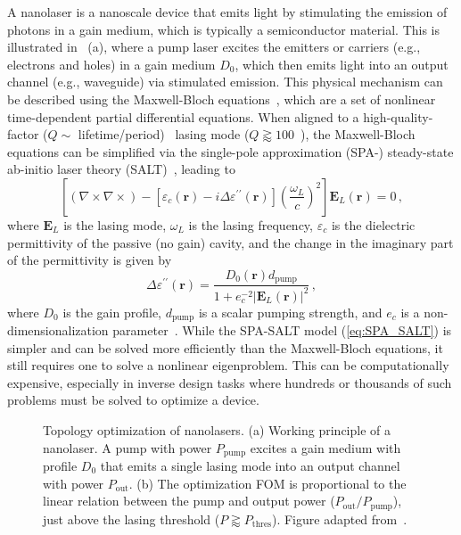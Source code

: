 A nanolaser is a nanoscale device that emits light by stimulating the emission of photons in a gain medium, which is typically a semiconductor material. This is illustrated
in ~(a), where a pump laser excites the emitters or carriers (e.g., electrons and holes) in a gain medium $D_0$, which then emits light into an output channel (e.g., waveguide) via
stimulated emission. This physical
mechanism can be described using the Maxwell-Bloch equations~\cite{haken_laser_dynamics, PhysRev.134.A1429, SALT_original}, which are a set of nonlinear time-dependent 
partial differential equations. When aligned to a high-quality-factor ($Q \sim$ lifetime/period)~\cite{phot_crys} lasing mode ($Q\gtrapprox 100$~\cite{cerjan_2016}), the Maxwell-Bloch equations can be simplified via the single-pole approximation (SPA-) steady-state ab-initio laser theory (SALT)~\cite{Ge_2010}, leading to
\begin{equation}\label{eq:SPA_SALT}
    \left[(\nabla \times 
     \nabla \times ) -\left[\varepsilon_c(\mathbf{r})-i \Delta \varepsilon^{\prime \prime} (\mathbf{r})\right] \left(\frac{\omega_L}{c}\right)^2\right] \mathbf{E}_L(\mathbf{r})=0\,,
\end{equation}
where $\mathbf{E}_L$ is the lasing mode, $\omega_L$ is the lasing frequency, $\varepsilon_c$ is the dielectric permittivity of the passive (no gain) cavity, and the change in the 
imaginary part of the permittivity is given by
\begin{equation}\label{eq:gain_SALT}
        \Delta \varepsilon^{\prime \prime} (\mathbf{r}) =  \frac{D_0(\mathbf{r}) d_\text{pump}}{1+ e_c^{-2}\left|\mathbf{E}_L(\mathbf{r})\right|^2}\,,
\end{equation}
where $D_0$ is the gain profile, $d_\text{pump}$ is a scalar pumping strength, and $e_c$ is a non-dimensionalization parameter~\cite{Ge_2010}. While the SPA-SALT model (\eqref{eq:SPA_SALT}) 
is simpler and can be solved more efficiently than the Maxwell-Bloch equations, it still requires one to solve a nonlinear eigenproblem. This can be computationally expensive, especially in 
inverse design tasks where hundreds or thousands of such problems must be solved to optimize a device.

\begin{figure}[tb]
    \centering
    \caption{Topology optimization of nanolasers. (a) Working principle of a nanolaser. A pump with power $P_\text{pump}$ excites a gain medium with profile
    $D_0$ that emits a single lasing mode into an output channel with power $P_\text{out}$. (b) The optimization FOM is proportional to the linear relation between the pump and output power ($P_\text{out}/P_\text{pump}$),
    just above the lasing threshold ($P \gtrapprox P_\text{thres}$).  Figure adapted from~\cite{ownpub4}.}
    \label{fig:laser2d}
\end{figure}

